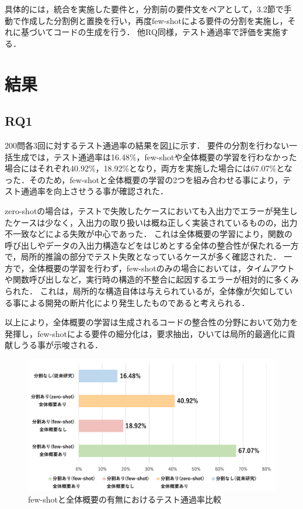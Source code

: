 \documentclass[submit,techrep,noauthor]{ipsj}
\begin{document}
具体的には，統合を実施した要件と，分割前の要件文をペアとして，3.2節で手動で作成した分割例と置換を行い，再度few-shotによる要件の分割を実施し，それに基づいてコードの生成を行う．
他RQ同様，テスト通過率で評価を実施する．

\section{結果}
\label{sec:result}

\subsection{RQ1}
200問各3回に対するテスト通過率の結果を図\ref{ses2025}に示す．
要件の分割を行わない一括生成では，テスト通過率は16.48\%，few-shotや全体概要の学習を行わなかった場合にはそれぞれ40.92\%，18.92\%となり，両方を実施した場合には67.07\%となった．そのため，few-shotと全体概要の学習の2つを組み合わせる事により，テスト通過率を向上させうる事が確認された．

zero-shotの場合は，テストで失敗したケースにおいても入出力でエラーが発生したケースは少なく，入出力の取り扱いは概ね正しく実装されているものの，出力不一致などによる失敗が中心であった．
これは全体概要の学習により，関数の呼び出しやデータの入出力構造などをはじめとする全体の整合性が保たれる一方で，局所的推論の部分でテスト失敗となっているケースが多く確認された．
一方で，全体概要の学習を行わず，few-shotのみの場合においては，タイムアウトや関数呼び出しなど，実行時の構造的不整合に起因するエラーが相対的に多くみられた．
これは，局所的な構造自体は与えられているが，全体像が欠如している事による開発の断片化により発生したものであると考えられる．

以上により，全体概要の学習は生成されるコードの整合性の分野において効力を発揮し，few-shotによる要件の細分化は，要求抽出，ひいては局所的最適化に貢献しうる事が示唆される．


\begin{figure}[t]
    \centering
    \includegraphics[width=1.0\linewidth]{./Toyoshima_fig/SIGSE_fig1.pdf}
    \caption{few-shotと全体概要の有無におけるテスト通過率比較}
    \label{ses2025}
\end{figure}
\end{document}
